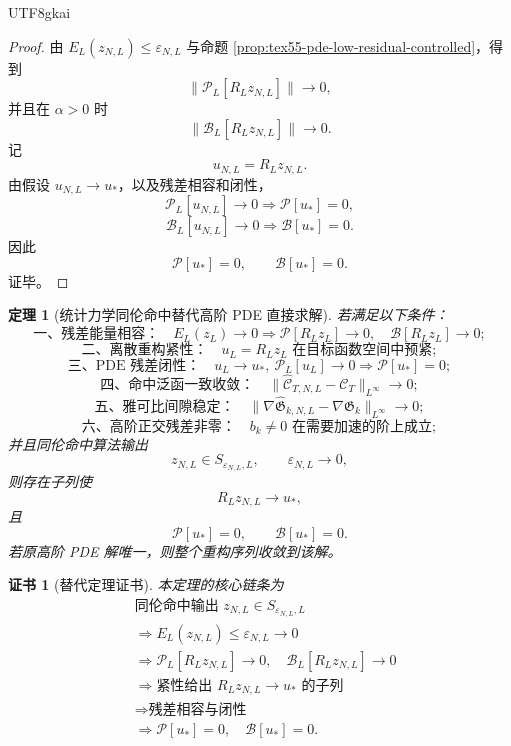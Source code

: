 \documentclass[12pt]{article}
\newtheorem{theorem}{定理}[section]
\newtheorem{Certificate}{证书}[section]
\begin{document}
\begin{CJK*}{UTF8}{gkai}
\begin{proof}
由 \(E_L(z_{N,L})\le\varepsilon_{N,L}\) 与命题
\ref{prop:tex55-pde-low-residual-controlled}，得到
\[
  \lVert\mathcal P_L[R_Lz_{N,L}]\rVert\to0,
\]
并且在 \(\alpha>0\) 时
\[
  \lVert\mathcal B_L[R_Lz_{N,L}]\rVert\to0.
\]
记
\[
  u_{N,L}=R_Lz_{N,L}.
\]
由假设 \(u_{N,L}\to u_*\)，以及残差相容和闭性，
\[
  \mathcal P_L[u_{N,L}]\to0
  \Longrightarrow
  \mathcal P[u_*]=0,
\]
\[
  \mathcal B_L[u_{N,L}]\to0
  \Longrightarrow
  \mathcal B[u_*]=0.
\]
因此
\[
  \mathcal P[u_*]=0,
  \qquad
  \mathcal B[u_*]=0.
\]
证毕。
\end{proof}

\begin{theorem}[统计力学同伦命中替代高阶 PDE 直接求解]
\label{thm:tex55-pde-paradigm-replacement}
若满足以下条件：
\[
  \text{一、残差能量相容：}
  \quad
  E_L(z_L)\to0
  \Longrightarrow
  \mathcal P[R_Lz_L]\to0,\quad
  \mathcal B[R_Lz_L]\to0;
\]
\[
  \text{二、离散重构紧性：}
  \quad
  u_L=R_Lz_L
  \text{ 在目标函数空间中预紧};
\]
\[
  \text{三、PDE 残差闭性：}
  \quad
  u_L\to u_*,
  \ \mathcal P_L[u_L]\to0
  \Longrightarrow
  \mathcal P[u_*]=0;
\]
\[
  \text{四、命中泛函一致收敛：}
  \quad
  \lVert\widehat{\mathcal C}_{T,N,L}-\mathcal C_T\rVert_{L^\infty}\to0;
\]
\[
  \text{五、雅可比间隙稳定：}
  \quad
  \lVert\nabla\widehat{\mathfrak G}_{k,N,L}-\nabla\mathfrak G_k\rVert_{L^\infty}\to0;
\]
\[
  \text{六、高阶正交残差非零：}
  \quad
  b_k\neq0
  \text{ 在需要加速的阶上成立};
\]
并且同伦命中算法输出
\[
  z_{N,L}\in S_{\varepsilon_{N,L},L},
  \qquad
  \varepsilon_{N,L}\to0,
\]
则存在子列使
\[
  R_Lz_{N,L}\to u_*,
\]
且
\[
  \mathcal P[u_*]=0,
  \qquad
  \mathcal B[u_*]=0.
\]
若原高阶 PDE 解唯一，则整个重构序列收敛到该解。
\end{theorem}

\begin{Certificate}[替代定理证书]
\label{cert:tex55-pde-paradigm-replacement}
本定理的核心链条为
\[
\begin{aligned}
  &\text{同伦命中输出 }z_{N,L}\in S_{\varepsilon_{N,L},L}\\
  &\Longrightarrow
  E_L(z_{N,L})\le\varepsilon_{N,L}\to0\\
  &\Longrightarrow
  \mathcal P_L[R_Lz_{N,L}]\to0,\quad
  \mathcal B_L[R_Lz_{N,L}]\to0\\
  &\Longrightarrow
  \text{紧性给出 }R_Lz_{N,L}\to u_*\text{ 的子列}\\
  &\Longrightarrow
  \text{残差相容与闭性}\\
  &\Longrightarrow
  \mathcal P[u_*]=0,\quad
  \mathcal B[u_*]=0.
\end{aligned}
\]
\end{Certificate}


\end{CJK*}
\end{document}
